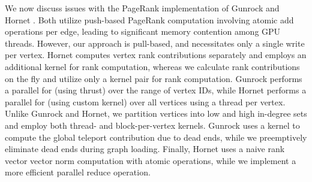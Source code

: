 We now discuss issues with the PageRank implementation of Gunrock \cite{wang2016gunrock} and Hornet \cite{busato2018hornet}. Both utilize push-based PageRank computation involving atomic add operations per edge, leading to significant memory contention among GPU threads. However, our approach is pull-based, and necessitates only a single write per vertex. Hornet computes vertex rank contributions separately and employs an additional kernel for rank computation, whereas we calculate rank contributions on the fly and utilize only a kernel pair for rank computation. Gunrock performs a parallel for (using thrust) over the range of vertex IDs, while Hornet performs a parallel for (using custom kernel) over all vertices using a thread per vertex. Unlike Gunrock and Hornet, we partition vertices into low and high in-degree sets and employ both thread- and block-per-vertex kernels. Gunrock uses a kernel to compute the global teleport contribution due to dead ends, while we preemptively eliminate dead ends during graph loading. Finally, Hornet uses a naive rank vector vector norm computation with atomic operations, while we implement a more efficient parallel reduce operation.

